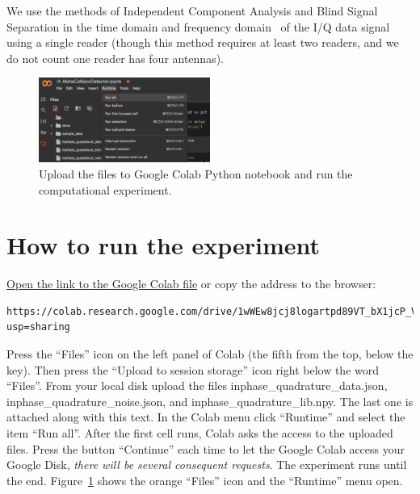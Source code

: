 \documentclass[12pt]{article}
\begin{document}
We use the methods of Independent Component Analysis and Blind Signal Separation in the time domain and frequency domain~\cite{Hyvaerinen2000,Elliott1999} of the I/Q data signal using a single reader (though this method requires at least two readers, and we do not count one reader has four antennas). 

\begin{figure}[!b]
\centering
\includegraphics[width=0.5\textwidth]{fig_demo_upload}
\caption{Upload the files to Google Colab Python notebook and run the computational experiment.}
\label{fig:demo}
\end{figure}

\section{How to run the experiment}\label{sec:experiment}
\href{https://colab.research.google.com/drive/1wWEw8jcj8logartpd89VT_bX1jcP_VBb?usp=sharing}{Open the link to the Google Colab file} or copy the address to the browser:
{\footnotesize
\begin{verbatim}https://colab.research.google.com/drive/1wWEw8jcj8logartpd89VT_bX1jcP_VBb?usp=sharing\end{verbatim}}
\noindent
Press the ``Files'' icon on the left panel of Colab (the fifth from the top, below the key). Then press the ``Upload to session storage'' icon right below the word ``Files''.  From your local disk upload the files \textsf{inphase\_quadrature\_data.json}, \textsf{inphase\_quadrature\_noise.json}, and \textsf{inphase\_quadrature\_lib.npy}. The last one is attached along with this text. In the Colab menu click ``Runtime'' and select the item ``Run all''. After the first cell runs, Colab asks the access to the uploaded files. Press the button ``Continue'' each time to let the Google Colab access your Google Disk, \emph{there will be several consequent requests}. The experiment runs until the end. Figure~\ref{fig:demo} shows the orange ``Files'' icon and the ``Runtime'' menu open.\sloppy{}



\end{document}

